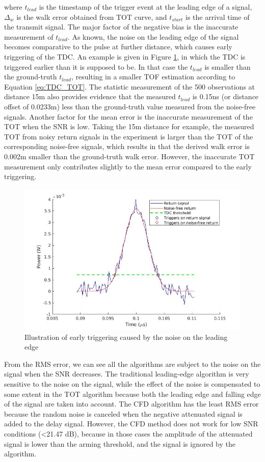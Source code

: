 where $t_{lead}$ is the timestamp of the trigger event at the leading edge of a signal, $\Delta_w$ is the walk error obtained from TOT curve, and $t_{start}$ is the arrival time of the transmit signal. The major factor of the negative bias is the inaccurate measurement of $t_{lead}$. As known, the noise on the leading edge of the signal becomes comparative to the pulse at further distance, which causes early triggering of the TDC. An example is given in Figure \ref{fig:TDC_earlyTrigger}, in which the TDC is triggered earlier than it is supposed to be. In that case the $t_{lead}$ is smaller than the ground-truth $t_{lead}$, resulting in a smaller TOF estimation according to Equation \eqref{eq:TDC_TOT}. The statistic measurement of the 500 observations at distance 15m also provides evidence that the measured $t_{lead}$ is 0.15ns (or distance offset of 0.0233m) less than the ground-truth value measured from the noise-free signals. Another factor for the mean error is the inaccurate measurement of the TOT when the SNR is low. Taking the 15m distance for example, the measured TOT from noisy return signals in the experiment is larger than the TOT of the corresponding noise-free signals, which results in that the derived walk error is 0.002m smaller than the ground-truth walk error. However, the inaccurate TOT measurement only contributes slightly to the mean error compared to the early triggering.
\begin{figure}[t!p]
\centering
\includegraphics[width=.8\textwidth]{figures/chapter7_TDC/signal_TOT_d_15_trigger.jpg}
\caption{Illustration of early triggering caused by the noise on the leading edge}
\label{fig:TDC_earlyTrigger}
\end{figure}
From the RMS error, we can see all the algorithms are subject to the noise on the signal when the SNR decreases. The traditional leading-edge algorithm is very sensitive to the noise on the signal, while the effect of the noise is compensated to some extent in the TOT algorithm because both the leading edge and falling edge of the signal are taken into account. The CFD algorithm has the least RMS error because the random noise is canceled when the negative attenuated signal is added to the delay signal. However, the CFD method does not work for low SNR conditions (<21.47 dB), because in those cases the amplitude of the attenuated signal is lower than the arming threshold, and the signal is ignored by the algorithm.
